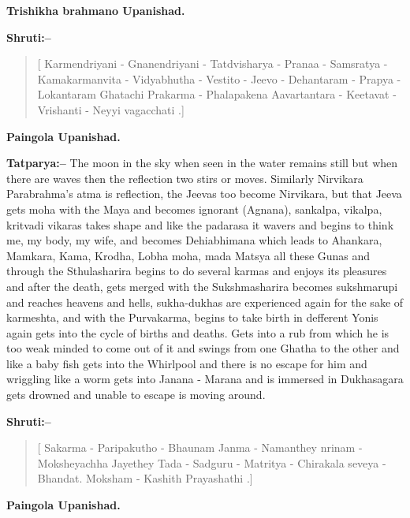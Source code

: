 \begin{flushright}
\textbf{Trishikha brahmano Upanishad.}
\end{flushright}

\textbf{Shruti:–}

\begin{verse}
[ Karmendriyani - Gnanendriyani - Tatdvisharya - Pranaa - Samsratya - Kamakarmanvita - Vidyabhutha - Vestito - Jeevo - Dehantaram - Prapya - Lokantaram Ghatachi  Prakarma - Phalapakena Aavartantara - Keetavat - Vrishanti - Neyyi vagacchati .]
\end{verse}

\begin{flushright}
\textbf{Paingola Upanishad.}
\end{flushright}

\textbf{Tatparya:–} The moon in the sky when seen in the water remains still but when there are waves then the reflection two stirs or moves. Similarly Nirvikara Parabrahma's atma is reflection, the Jeevas too become Nirvikara, but that Jeeva gets moha with the Maya and becomes ignorant (Agnana), sankalpa, vikalpa, kritvadi vikaras takes shape and like the padarasa it wavers and begins to think me, my body, my wife, and becomes Dehiabhimana which leads to Ahankara, Mamkara, Kama, Krodha, Lobha moha, mada Matsya all these Gunas and through the Sthulasharira begins to do several karmas and enjoys its pleasures and after the death, gets merged with the Sukshmasharira becomes sukshmarupi and reaches heavens and hells, sukha-dukhas are experienced again for the sake of karmeshta, and with the Purvakarma, begins to take birth in defferent Yonis again gets into the cycle of births and deaths. Gets into a rub from which he is too weak minded to come out of it and swings from one Ghatha to the other and like a baby fish gets into the Whirlpool and there is no escape for him and wriggling like a worm gets into Janana - Marana and is immersed in Dukhasagara gets drowned and unable to escape is moving around.

\textbf{Shruti:–}

\begin{verse}
[ Sakarma - Paripakutho - Bhaunam Janma - Namanthey nrinam - Moksheyachha Jayethey  Tada - Sadguru - Matritya - Chirakala seveya - Bhandat. Moksham - Kashith Prayashathi .]
\end{verse}

\begin{flushright}
\textbf{Paingola Upanishad.}
\end{flushright}

